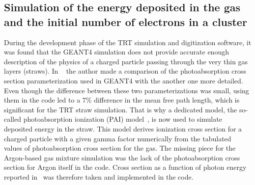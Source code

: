 \subsection{Simulation of the energy deposited in the gas and the initial number of electrons in a cluster}
\label{subsec:pai_model}
During the development phase of the TRT simulation and digitization software, it was found that the GEANT4 simulation does not provide accurate enough description of the physics
of a charged particle passing through the very thin gas layers (straws). 
In ~\cite{kittelmann_thesis} the author made a comparison of the photoabsorption cross section parameterization used in GEANT4 with the another one more detailed.
Even though the difference between these two parameterizations was small, using them in the code led to a 7$\%$ difference in the mean free path length, which is significant for the TRT straw simulation.
That is why a dedicated model, the so-called photoabsorption ionization (PAI) model~\cite{pai_model_paper}, is now used to simulate deposited energy in the straw.
This model derives ionization cross section for a charged particle with a given gamma factor numerically from the tabulated values of photoabsorption cross section for the gas.
The missing piece for the Argon-based gas mixture simulation was the lack of the photoabsorption cross section for Argon itself in the code.
Cross section as a function of photon energy reported in~\cite{argon_cross_section} was therefore taken and implemented in the code.

